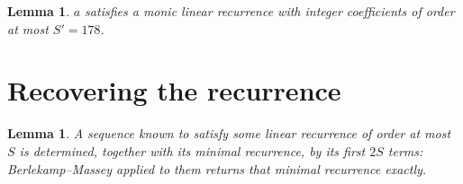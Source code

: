 \documentclass[11pt,a4paper]{article}
\theoremstyle{plain}
\newtheorem{lemma}[theorem]{Lemma}
\theoremstyle{definition}
\begin{document}
\begin{lemma}\label{lem:cf}
$a$ satisfies a monic linear recurrence with integer coefficients of order at most
$S'=178$.
\end{lemma}

\section{Recovering the recurrence}

\begin{lemma}\label{lem:bm}
A sequence known to satisfy some linear recurrence of order at most $S$ is determined, together
with its minimal recurrence, by its first $2S$ terms: Berlekamp--Massey applied to them returns
that minimal recurrence exactly.
\end{lemma}
\end{document}
